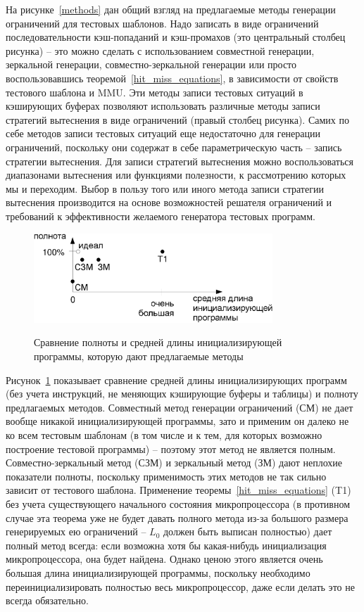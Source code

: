 На рисунке~\ref{methods} дан общий взгляд на предлагаемые методы
генерации ограничений для тестовых шаблонов. Надо записать в виде
ограничений последовательности кэш-попаданий и кэш-промахов (это
центральный столбец рисунка) -- это можно сделать с использованием
совместной генерации, зеркальной генерации, совместно-зеркальной
генерации или просто воспользовавшись
теоремой~\ref{hit_miss_equations}, в зависимости от свойств
тестового шаблона и MMU. Эти методы записи тестовых ситуаций в
кэширующих буферах позволяют использовать различные методы записи
стратегий вытеснения в виде ограничений (правый столбец рисунка).
Самих по себе методов записи тестовых ситуаций еще недостаточно для
генерации ограничений, поскольку они содержат в себе параметрическую
часть -- запись стратегии вытеснения. Для записи стратегий
вытеснения можно воспользоваться диапазонами вытеснения или
функциями полезности, к рассмотрению которых мы и переходим. Выбор в
пользу того или иного метода записи стратегии вытеснения
производится на основе возможностей решателя ограничений и
требований к эффективности желаемого генератора тестовых программ.

\begin{figure}[ht]
  \includegraphics[width=0.8\textwidth]{2.theor/lenful}\\
  \caption{Сравнение полноты и средней длины инициализирующей программы,
  которую дают предлагаемые методы}\label{lenful}
\end{figure}

Рисунок~\ref{lenful} показывает сравнение средней длины
инициализирующих программ (без учета инструкций, не меняющих
кэширующие буферы и таблицы) и полноту предлагаемых методов.
Совместный метод генерации ограничений (СМ) не дает вообще никакой
инициализирующей программы, зато и применим он далеко не ко всем
тестовым шаблонам (в том числе и к тем, для которых возможно
построение тестовой программы) -- поэтому этот метод не является
полным. Совместно-зеркальный метод (СЗМ) и зеркальный метод (ЗМ)
дают неплохие показатели полноты, поскольку применимость этих
методов не так сильно зависит от тестового шаблона. Применение
теоремы~\ref{hit_miss_equations} (T1) без учета существующего
начального состояния микропроцессора (в противном случае эта теорема
уже не будет давать полного метода из-за большого размера
генерируемых ею ограничений -- $L_0$ должен быть выписан полностью)
дает полный метод всегда: если возможна хотя бы какая-нибудь
инициализация микропроцессора, она будет найдена. Однако ценою этого
является очень большая длина инициализирующей программы, поскольку
необходимо переинициализировать полностью весь микропроцессор, даже
если делать это не всегда обязательно.

